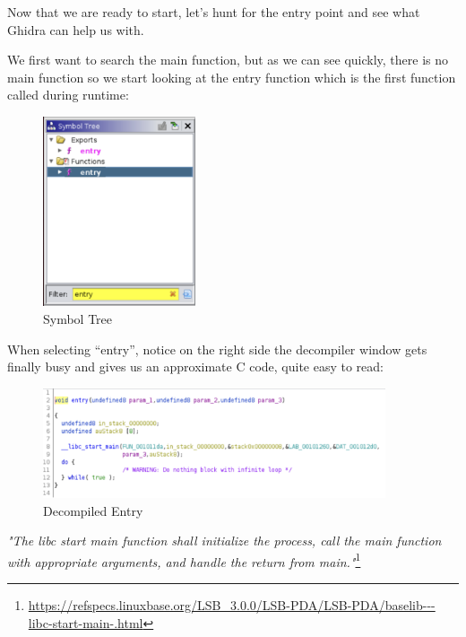 \documentclass{article}
\begin{document}
\noindent\linebreak
Now that we are ready to start, let’s hunt for the entry point and see what Ghidra can help us with.

\noindent\linebreak
We first want to search the main function, but as we can see quickly, there is no main function so we start 
looking at the entry function which is the first function called during runtime:
\begin{figure}[H]
\centering
\includegraphics[width=0.4\textwidth]{img/ghidra_2.pdf}
\caption{Symbol Tree}
\label{fig:ghidra_2}
\end{figure}

\noindent\linebreak
When selecting “entry”, notice on the right side the decompiler window gets finally busy and gives us an 
approximate C code, quite easy to read:
\begin{figure}[H]
\centering
\includegraphics[width=0.9\textwidth]{img/ghidra_3.pdf}
\caption{Decompiled Entry}
\label{fig:ghidra_3}
\end{figure}

\noindent\linebreak
\textit{"The libc start main function shall initialize the process, call the main function with appropriate 
arguments, and handle the return from main."}\footnote{\url{https://refspecs.linuxbase.org/LSB_3.0.0/LSB-PDA/LSB-PDA/baselib---libc-start-main-.html}}
\end{document}
